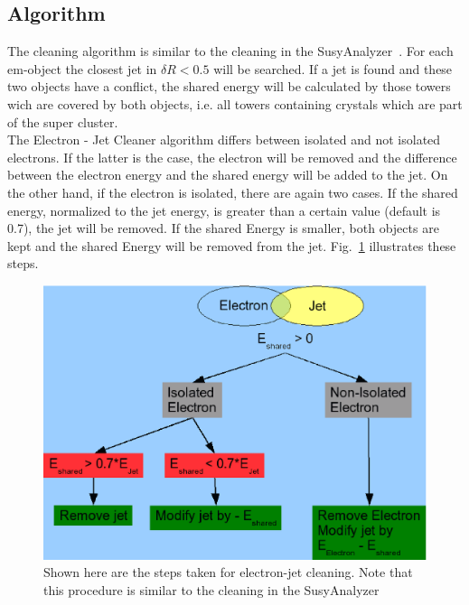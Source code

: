\documentclass{cmspaper}
\begin{document}
\subsection{Algorithm}
The cleaning algorithm is similar to the cleaning in the SusyAnalyzer~\cite{SusyAnalyzer}.
For each em-object the closest jet in \(\delta R < 0.5\) will be searched. If a jet is found and these two objects have a conflict, the shared energy will be calculated by those towers wich are covered by both objects, i.e. all towers containing crystals which are part of the super cluster.\\
The Electron - Jet Cleaner algorithm differs between isolated and not isolated electrons. If the latter is the case, the electron will be removed and the difference between the electron energy and the shared energy will be added to the jet. On the other hand, if the electron is isolated, there are again two cases. If the shared energy, normalized to the jet energy, is greater than a certain value (default is 0.7), the jet will be removed. If the shared Energy is smaller, both objects are kept and the shared Energy will be removed from the jet. Fig.~\ref{fig:EJCleaning} illustrates these steps.
\begin{figure}[hbtp]
  \begin{center}
    \includegraphics[scale=.4]{ElectronJetCleaning.eps}
    \caption{Shown here are the steps taken for electron-jet cleaning. Note that this procedure is similar to the cleaning in the SusyAnalyzer~\cite{SusyAnalyzer}}
    \label{fig:EJCleaning}
  \end{center}
\end{figure}
\end{document}

